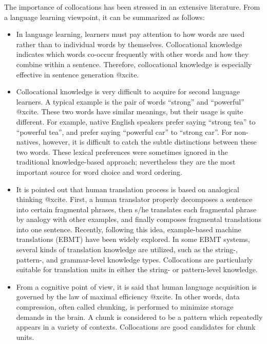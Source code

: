 The importance of collocations has been stressed
in an extensive literature.
From a language learning viewpoint, it can be summarized as follows:

\begin{itemize}
\item
In language learning, learners must pay attention to
how words are used rather than to individual words by themselves.
Collocational knowledge indicates
which words co-occur frequently with other words and
how they combine within a sentence.
Therefore, collocational knowledge is especially effective
in sentence generation
@xcite.

\item
Collocational knowledge is very difficult
to acquire for second language learners.
A typical example is the pair of words ``strong'' and ``powerful''
@xcite.
These two words have similar meanings,
but their usage is quite different.
For example, native English speakers prefer saying
``strong tea'' to ``powerful tea'',
and prefer saying ``powerful car'' to ``strong car''.
For non-natives, however,
it is difficult to catch the subtle distinctions between these two words.
These lexical preferences were sometimes ignored
in the traditional knowledge-based approach;
nevertheless they are the most important source
for word choice and word ordering.

\item
It is pointed out that human translation process
is based on analogical thinking @xcite.
First, a human translator properly decomposes a sentence
into certain fragmental phrases, then s/he translates
each fragmental phrase by analogy with other examples,
and finally composes fragmental translations into one sentence.
Recently, following this idea,
example-based machine translations (EBMT) have been widely explored.
In some EBMT systems, several kinds of translation knowledge
are utilized, such as the string-, pattern-, and grammar-level
knowledge types.
Collocations are particularly suitable for translation units
in either the string- or pattern-level knowledge.


\item
From a cognitive point of view,
it is said that human language acquisition is governed by
the law of maximal efficiency @xcite.
In other words, data compression, often called chunking, is performed to
minimize storage demands in the brain.
A chunk is considered to be a pattern which repeatedly appears
in a variety of contexts.
Collocations are good candidates for chunk units.
\end{itemize}


